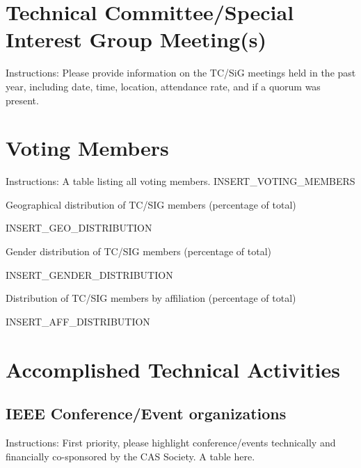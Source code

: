 \documentclass{article}
\begin{document}




\setcounter{page}{1}

\section{Technical Committee/Special Interest Group Meeting(s)}
\label{sec:tcmeetings}

Instructions: Please provide information on the TC/SiG meetings held in the past year, including date, time, location, attendance rate, and if a quorum was present.

\section{Voting Members}
\label{sec:votingmembers}

Instructions: A table listing all voting members.
INSERT_VOTING_MEMBERS

Geographical distribution of TC/SIG members (percentage of total)

INSERT_GEO_DISTRIBUTION

Gender distribution of TC/SIG members (percentage of total)

INSERT_GENDER_DISTRIBUTION

Distribution of TC/SIG members by affiliation (percentage of total)

INSERT_AFF_DISTRIBUTION

\section{Accomplished Technical Activities}
\label{sec:activities}

\subsection{IEEE Conference/Event organizations}
Instructions: First priority, please highlight conference/events technically and financially co-sponsored by the CAS Society. A table here.
\end{document}

